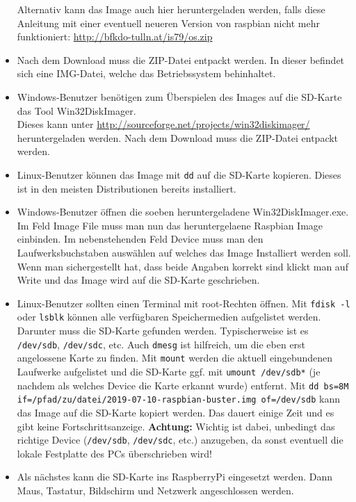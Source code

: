 \begin{itemize}
{		Alternativ kann das Image auch hier heruntergeladen werden, falls diese Anleitung mit einer eventuell neueren Version von raspbian nicht mehr funktioniert: \url{http://bfkdo-tulln.at/is79/os.zip}
		}
	\item {Nach dem Download muss die ZIP-Datei entpackt werden. In dieser befindet sich eine IMG-Datei, welche das Betriebssystem behinhaltet.}
	\item {Windows-Benutzer benötigen zum Überspielen des Images auf die SD-Karte das Tool Win32DiskImager.\\
		Dieses kann unter \url{http://sourceforge.net/projects/win32diskimager/} heruntergeladen werden. 
		Nach dem Download muss die ZIP-Datei entpackt werden.
		}
	\item {Linux-Benutzer können das Image mit \lstinline|dd| auf die SD-Karte kopieren. Dieses ist in den meisten Distributionen bereits installiert.
		}
	\item {Windows-Benutzer öffnen die soeben heruntergeladene Win32DiskImager.exe. Im Feld Image File muss man nun das heruntergelaene Raspbian Image einbinden. 
		Im nebenstehenden Feld Device muss man den Laufwerksbuchstaben auswählen auf welches das Image Installiert werden soll. 
		Wenn man sichergestellt hat, dass beide Angaben korrekt sind klickt man auf Write und das Image wird auf die SD-Karte geschrieben.
		}
	\item {Linux-Benutzer sollten einen Terminal mit root-Rechten öffnen. 
		Mit \lstinline|fdisk -l| oder \lstinline|lsblk| können alle verfügbaren Speichermedien aufgelistet werden. Darunter muss die SD-Karte gefunden werden.
		Typischerweise ist es \lstinline|/dev/sdb|, \lstinline|/dev/sdc|, etc.
		Auch \lstinline|dmesg| ist hilfreich, um die eben erst angelossene Karte zu finden. 
		Mit \lstinline|mount| werden die aktuell eingebundenen Laufwerke aufgelistet und 
		die SD-Karte ggf. mit \lstinline|umount /dev/sdb*| (je nachdem als welches Device die Karte erkannt wurde) entfernt.
		Mit \lstinline|dd bs=8M if=/pfad/zu/datei/2019-07-10-raspbian-buster.img of=/dev/sdb| kann das Image auf die SD-Karte kopiert werden.
		Das dauert einige Zeit und es gibt keine Fortschrittsanzeige.
		\textbf{Achtung:} Wichtig ist dabei, unbedingt das richtige Device (\lstinline|/dev/sdb|, \lstinline|/dev/sdc|, etc.) anzugeben, 
		da sonst eventuell die lokale Festplatte des PCs überschrieben wird!
		}
	\item {Als nächstes kann die SD-Karte ins RaspberryPi eingesetzt werden. Dann Maus, Tastatur, Bildschirm und Netzwerk angeschlossen werden. 
}
\end{itemize}
